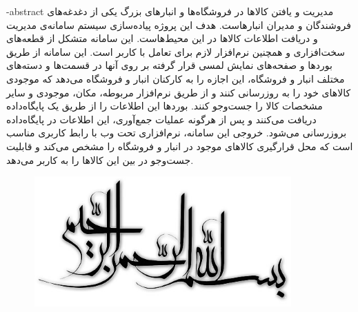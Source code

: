 

\fa-abstract{
مدیریت و یافتن کالاها در فروشگاه‌ها و انبار‌های بزرگ یکی از دغدغه‌های فروشندگان و مدیران انبارهاست. هدف این پروژه پیاده‌سازی سیستم سامانه‌ی مدیریت و دریافت اطلاعات کالاها در این محیط‌هاست. این سامانه متشکل از قطعه‌های سخت‌افزاری و همچنین نرم‌افزار لازم برای تعامل با کاربر است. این سامانه از طریق بوردها و صفحه‌های نمایش لمسی قرار گرفته بر روی آنها در قسمت‌ها و دسته‌های مختلف انبار و فروشگاه، این اجازه را به کارکنان انبار و فروشگاه می‌دهد که موجودی کالا‌های خود را به روز‌رسانی کنند و از طریق نرم‌افزار مربوطه، مکان، موجودی و سایر مشخصات کالا را جست‌و‌جو کنند. بوردها این اطلاعات را از طریق یک پایگاه‌داده دریافت می‌کنند و پس از هرگونه عملیات جمع‌آوری، این اطلاعات در پایگاه‌داده بروزرسانی می‌شود. خروجی این سامانه، نرم‌افزاری تحت وب با رابط کاربری مناسب است که محل قرارگیری کالا‌های موجود در انبار و فروشگاه را مشخص می‌کند و قابلیت جست‌و‌جو در بین این کالا‌ها را به کاربر می‌دهد.
}





\AUTtitle
\vspace*{7cm}
\thispagestyle{empty}
\begin{center}
\includegraphics[height=5cm,width=12cm]{besm}
\end{center}